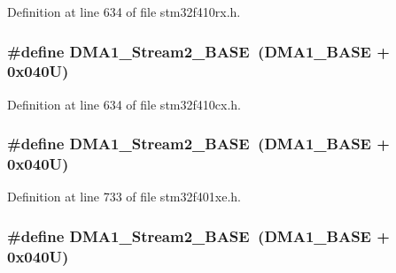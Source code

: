 Definition at line 634 of file stm32f410rx.\+h.

\subsubsection[{\texorpdfstring{D\+M\+A1\+\_\+\+Stream2\+\_\+\+B\+A\+SE}{DMA1_Stream2_BASE}}]{\setlength{\rightskip}{0pt plus 5cm}\#define D\+M\+A1\+\_\+\+Stream2\+\_\+\+B\+A\+SE~({\bf D\+M\+A1\+\_\+\+B\+A\+SE} + 0x040\+U)}\hypertarget{group___peripheral__registers__structures_ga48a551ee91d3f07dd74347fdb35c703d}{}\label{group___peripheral__registers__structures_ga48a551ee91d3f07dd74347fdb35c703d}


Definition at line 634 of file stm32f410cx.\+h.

\subsubsection[{\texorpdfstring{D\+M\+A1\+\_\+\+Stream2\+\_\+\+B\+A\+SE}{DMA1_Stream2_BASE}}]{\setlength{\rightskip}{0pt plus 5cm}\#define D\+M\+A1\+\_\+\+Stream2\+\_\+\+B\+A\+SE~({\bf D\+M\+A1\+\_\+\+B\+A\+SE} + 0x040\+U)}\hypertarget{group___peripheral__registers__structures_ga48a551ee91d3f07dd74347fdb35c703d}{}\label{group___peripheral__registers__structures_ga48a551ee91d3f07dd74347fdb35c703d}


Definition at line 733 of file stm32f401xe.\+h.

\subsubsection[{\texorpdfstring{D\+M\+A1\+\_\+\+Stream2\+\_\+\+B\+A\+SE}{DMA1_Stream2_BASE}}]{\setlength{\rightskip}{0pt plus 5cm}\#define D\+M\+A1\+\_\+\+Stream2\+\_\+\+B\+A\+SE~({\bf D\+M\+A1\+\_\+\+B\+A\+SE} + 0x040\+U)}\hypertarget{group___peripheral__registers__structures_ga48a551ee91d3f07dd74347fdb35c703d}{}\label{group___peripheral__registers__structures_ga48a551ee91d3f07dd74347fdb35c703d}


